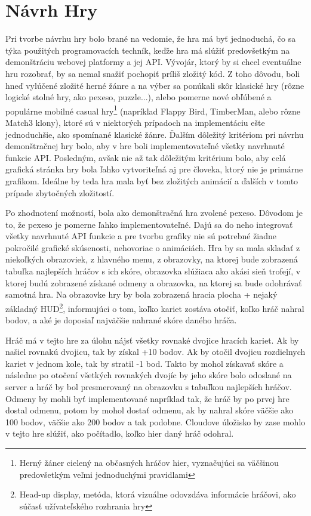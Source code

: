 \section{Návrh Hry}
Pri tvorbe návrhu hry bolo brané na vedomie, že hra má byť jednoduchá, čo sa týka použitých programovacích techník, keďže hra má slúžiť predovšetkým na demonštráciu webovej platformy a jej API. Vývojár, ktorý by si chcel eventuálne hru rozobrať, by sa nemal snažiť pochopiť príliš zložitý kód. Z toho dôvodu, boli hneď vylúčené zložité herné žánre a na výber sa ponúkali skôr klasické hry (rôzne logické stolné hry, ako pexeso, puzzle...), alebo pomerne nové obľúbené a populárne mobilné casual hry\footnote{Herný žáner cielený na občasných hráčov hier, vyznačujúci sa väčšinou predovšetkým veľmi jednoduchými pravidlami} (napríklad Flappy Bird, TimberMan, alebo rôzne Match3 klony), ktoré sú v niektorých prípadoch na implementáciu ešte jednoduchšie, ako spomínané klasické žánre. Ďalším dôležitý kritériom pri návrhu demonštračnej hry bolo, aby v hre boli implementovateľné všetky navrhnuté funkcie API. Posledným, avšak nie až tak dôležitým kritérium bolo, aby celá grafická stránka hry bola ľahko vytvoriteľná aj pre človeka, ktorý nie je primárne grafikom. Ideálne by teda hra mala byť bez zložitých animácií a ďalších v tomto prípade zbytočných zložitostí.  

Po zhodnotení možností, bola ako demonštračná hra zvolené pexeso. Dôvodom je to, že pexeso je pomerne ľahko implementovateľné. Dajú sa do neho integrovať všetky navrhnuté API funkcie a pre tvorbu grafiky nie sú potrebné žiadne pokročilé grafické skúsenosti, nehovoriac o animáciách. Hra by sa mala skladať z niekoľkých obrazoviek, z hlavného menu, z obrazovky, na ktorej bude zobrazená tabuľka najlepších hráčov s ich skóre, obrazovka slúžiaca ako akási sieň trofejí, v ktorej budú zobrazené získané odmeny a obrazovka, na ktorej sa bude odohrávať samotná hra. Na obrazovke hry by bola zobrazená hracia plocha + nejaký základný HUD\footnote{Head-up display, metóda, ktorá vizuálne odovzdáva informácie hráčovi, ako súčasť užívateľského rozhrania hry}, informujúci o tom, koľko kariet zostáva otočiť, koľko hráč nahral bodov, a aké je doposiaľ najväčšie nahrané skóre daného hráča.

Hráč má v tejto hre za úlohu nájsť všetky rovnaké dvojice hracích kariet. Ak by našiel rovnakú dvojicu, tak by získal +10 bodov. Ak by otočil dvojicu rozdielnych kariet v jednom kole, tak by stratil -1 bod. Takto by mohol získavať skóre a následne po otočení všetkých rovnakých dvojíc by jeho skóre bolo odoslané na server a hráč by bol presmerovaný na obrazovku s tabuľkou najlepších hráčov. Odmeny by mohli byť implementované napríklad tak, že hráč by po prvej hre dostal odmenu, potom by mohol dostať odmenu, ak by nahral skóre väčšie ako 100 bodov, väčšie ako 200 bodov a tak podobne. Cloudove úložisko by zase mohlo v tejto hre slúžiť, ako počítadlo, koľko hier daný hráč odohral. 

